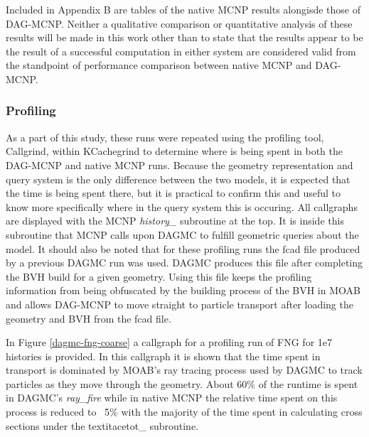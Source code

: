 \documentclass[12pt, a4paper]{article}
\begin{document}
Included in Appendix B are tables of the native MCNP results alongisde those of DAG-MCNP. Neither a qualitative comparison or quantitative analysis of these results will be made in this work other than to state that the results appear to be the result of a successful computation in either system are considered valid from the standpoint of performance comparison between native MCNP and DAG-MCNP.

\subsubsection{Profiling}%

As a part of this study, these runs were repeated using the profiling tool, Callgrind, within KCachegrind to determine where is being spent in both the DAG-MCNP and native MCNP runs. Because the geometry representation and query system is the only difference between the two models, it is expected that the time is being spent there, but it is practical to confirm this and useful to know more specifically where in the query system this is occuring. All callgraphs are displayed with the MCNP \textit{history\_} subroutine at the top. It is inside this subroutine that MCNP calls upon DAGMC to fulfill geometric queries about the model. It should also be noted that for these profiling runs the fcad file produced by a previous DAGMC run was used. DAGMC produces this file after completing the BVH build for a given geometry. Using this file keeps the profiling information from being obfuscated by the building process of the BVH in MOAB and allows DAG-MCNP to move straight to particle transport after loading the geometry and BVH from the fcad file. 

In Figure \ref{dagmc-fng-coarse} a callgraph for a profiling run of FNG for 1e7 histories is provided. In this callgraph it is shown that the time spent in transport is dominated by MOAB's ray tracing process used by DAGMC to track particles as they move through the geometry. About 60\% of the runtime is spent in DAGMC's \textit{ray\_fire} while in native MCNP the relative time spent on this process is reduced to ~5\% with the majority of the time spent in calculating cross sections under the textit{acetot\_} subroutine. 
\end{document}
